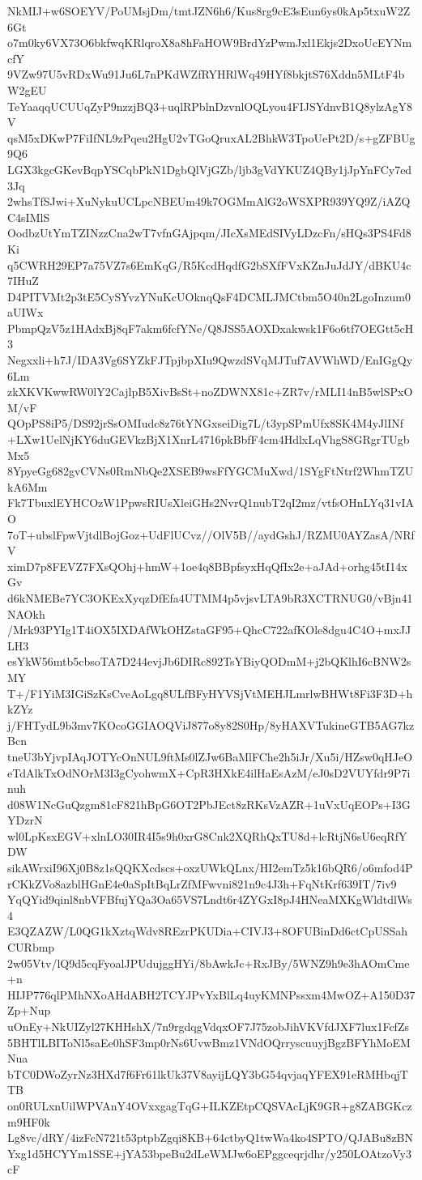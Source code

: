 NkMIJ+w6SOEYV/PoUMsjDm/tmtJZN6h6/Kus8rg9cE3sEun6ys0kAp5txuW2Z6Gt
o7m0ky6VX73O6bkfwqKRlqroX8a8hFaHOW9BrdYzPwmJxl1Ekjs2DxoUcEYNmcfY
9VZw97U5vRDxWu91Ju6L7nPKdWZfRYHRlWq49HYf8bkjtS76Xddn5MLtF4bW2gEU
TeYaaqqUCUUqZyP9nzzjBQ3+uqlRPblnDzvnlOQLyou4FIJSYdnvB1Q8ylzAgY8V
qsM5xDKwP7FiIfNL9zPqeu2HgU2vTGoQruxAL2BhkW3TpoUePt2D/s+gZFBUg9Q6
LGX3kgcGKevBqpYSCqbPkN1DgbQlVjGZb/ljb3gVdYKUZ4QBy1jJpYnFCy7ed3Jq
2whsTfSJwi+XuNykuUCLpcNBEUm49k7OGMmAlG2oWSXPR939YQ9Z/iAZQC4sIMlS
OodbzUtYmTZINzzCna2wT7vfnGAjpqm/JIcXsMEdSIVyLDzcFn/sHQs3PS4Fd8Ki
q5CWRH29EP7a75VZ7s6EmKqG/R5KcdHqdfG2bSXfFVxKZnJuJdJY/dBKU4c7IHuZ
D4PITVMt2p3tE5CySYvzYNuKcUOknqQsF4DCMLJMCtbm5O40n2LgoInzum0aUIWx
PbmpQzV5z1HAdxBj8qF7akm6fcfYNe/Q8JSS5AOXDxakwsk1F6o6tf7OEGtt5cH3
Negxxli+h7J/IDA3Vg6SYZkFJTpjbpXIu9QwzdSVqMJTuf7AVWhWD/EnIGgQy6Lm
zkXKVKwwRW0lY2CajlpB5XivBsSt+noZDWNX81c+ZR7v/rMLI14nB5wlSPxOM/vF
QOpPS8iP5/DS92jrSsOMIudc8z76tYNGxseiDig7L/t3ypSPmUfx8SK4M4yJlINf
+LXw1UelNjKY6duGEVkzBjX1XnrL4716pkBbfF4cm4HdlxLqVhgS8GRgrTUgbMx5
8YpyeGg682gvCVNs0RmNbQe2XSEB9wsFfYGCMuXwd/1SYgFtNtrf2WhmTZUkA6Mm
Fk7TbuxlEYHCOzW1PpwsRIUsXleiGHs2NvrQ1nubT2qI2mz/vtfsOHnLYq31vIAO
7oT+ubslFpwVjtdlBojGoz+UdFlUCvz//OlV5B//aydGshJ/RZMU0AYZasA/NRfV
ximD7p8FEVZ7FXsQOhj+hmW+1oe4q8BBpfsyxHqQfIx2e+aJAd+orhg45tI14xGv
d6kNMEBe7YC3OKExXyqzDfEfa4UTMM4p5vjsvLTA9bR3XCTRNUG0/vBjn41NAOkh
/Mrk93PYIg1T4iOX5IXDAfWkOHZstaGF95+QhcC722afKOle8dgu4C4O+mxJJLH3
esYkW56mtb5cbsoTA7D244evjJb6DIRc892TsYBiyQODmM+j2bQKlhI6cBNW2sMY
T+/F1YiM3IGiSzKsCveAoLgq8ULfBFyHYVSjVtMEHJLmrlwBHWt8Fi3F3D+hkZYz
j/FHTydL9b3mv7KOcoGGIAOQViJ877o8y82S0Hp/8yHAXVTukineGTB5AG7kzBcn
tneU3bYjvpIAqJOTYcOnNUL9ftMs0lZJw6BaMlFChe2h5iJr/Xu5i/HZsw0qHJeO
eTdAlkTxOdNOrM3I3gCyohwmX+CpR3HXkE4ilHaEsAzM/eJ0sD2VUYfdr9P7inuh
d08W1NcGuQzgm81cF821hBpG6OT2PbJEct8zRKsVzAZR+1uVxUqEOPs+I3GYDzrN
wl0LpKsxEGV+xlnLO30IR4I5s9h0xrG8Cnk2XQRhQxTU8d+lcRtjN6sU6eqRfYDW
sikAWrxiI96Xj0B8z1sQQKXcdscs+oxzUWkQLnx/HI2emTz5k16bQR6/o6mfod4P
rCKkZVo8azblHGnE4e0aSpItBqLrZfMFwvni821n9c4J3h+FqNtKrf639IT/7iv9
YqQYid9qinl8nbVFBfujYQa3Oa65VS7Lndt6r4ZYGxI8pJ4HNeaMXKgWldtdlWs4
E3QZAZW/L0QG1kXztqWdv8REzrPKUDia+CIVJ3+8OFUBinDd6ctCpUSSahCURbmp
2w05Vtv/lQ9d5cqFyoalJPUdujggHYi/8bAwkJc+RxJBy/5WNZ9h9e3hAOmCme+n
HIJP776qlPMhNXoAHdABH2TCYJPvYxBlLq4uyKMNPssxm4MwOZ+A150D37Zp+Nup
uOnEy+NkUIZyl27KHHshX/7n9rgdqgVdqxOF7J75zobJihVKVfdJXF7lux1FcfZs
5BHTlLBIToNl5saEe0hSF3mp0rNs6UvwBmz1VNdOQrryscuuyjBgzBFYhMoEMNua
bTC0DWoZyrNz3HXd7f6Fr61lkUk37V8ayijLQY3bG54qvjaqYFEX91eRMHbqjTTB
on0RULxnUilWPVAnY4OVxxgagTqG+ILKZEtpCQSVAcLjK9GR+g8ZABGKczm9HF0k
Lg8vc/dRY/4izFcN721t53ptpbZgqi8KB+64ctbyQ1twWa4ko4SPTO/QJABu8zBN
Yxg1d5HCYYm1SSE+jYA53bpeBu2dLeWMJw6oEPggceqrjdhr/y250LOAtzoVy3cF
